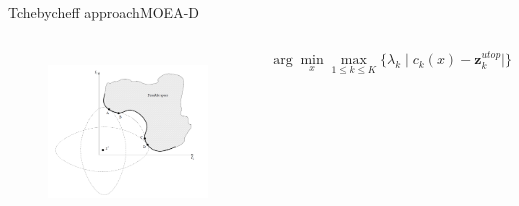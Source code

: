 \begin{frame}{Tchebycheff approach}{MOEA-D}
	\begin{columns}
		\begin{figure}
			\centering
			\includegraphics[width=\linewidth]{figure/tchebycheff}
			\label{fig:tchebycheff}
		\end{figure}
		\begin{minipage}{\textwidth}
            \begin{equation}
			\nonumber
			\arg\min_x \max_{1 \leq k \leq K}  \{ \lambda_{k} \mid c_{k}(x) - \bm{z}^{utop}_{k}  | \} 
			\end{equation}
		\end{minipage}
	\end{columns}
\end{frame}

